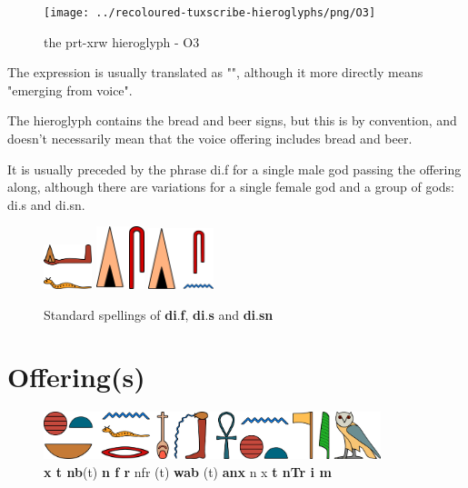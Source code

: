 \begin{figure} [H]
	\centering
	\texttt{[image: ../recoloured-tuxscribe-hieroglyphs/png/O3]}
	\caption{the prt-xrw hieroglyph - O3}
\end{figure}

The expression  is usually translated as "", although it more directly means "emerging from voice".

The hieroglyph contains the bread and beer signs, but this is by convention, and doesn't necessarily mean that the voice offering includes bread and beer.

It is usually preceded by the phrase di.f for a single male god passing the offering along, although there are variations for a single female god and a group of gods: di.s and di.sn.

\begin{figure} [H]
	\centering
	\includegraphics[width=0.125\textwidth]{../images/di-f}
	\hspace{0.1\textwidth}
	\includegraphics[width=0.125\textwidth]{../images/di-s}
	\hspace{0.1\textwidth}
	\includegraphics[width=0.169643\textwidth]{../images/di-sn}
	\caption{Standard spellings of \textbf{di}.\textbf{f}, \textbf{di}.\textbf{s} and \textbf{di}.\textbf{sn}}
\end{figure}

\section*{Offering(s)}

\begin{figure} [H]
	\centering
	\includegraphics[width=0.875\textwidth]{../images/xt-nb-nfr-wab-anxt-ntr-im}
	\caption{\textbf{x t nb}(t) \textbf{n f r} nfr (t) \textbf{wab} (t) \textbf{anx} n x \textbf{t nTr i m}}
\end{figure}

